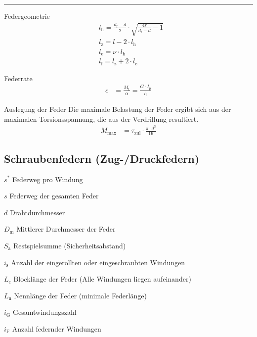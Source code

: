 \hrule
\begin{eeqn}{Federgeometrie}
	\begin{align}
		& l_\text{h} = \frac{d_\text{f}-d}{2}\cdot \sqrt{\frac{4r}{d_\text{f}-d}-1} \\
		& l_\text{z} = l- 2\cdot l_\text{h} \\
		& l_\text{e} = \nu \cdot l_\text{h}\\
		& l_\text{f} = l_\text{z} + 2\cdot l_\text{e}
	\end{align}
\end{eeqn}

\begin{eeqn}{Federrate}
	\begin{align}
		c &= \frac{M_\text{t}}{\alpha} = \frac{G\cdot I_\text{p}}{l_\text{f}}
	\end{align}
\end{eeqn}

\begin{eeqn}{Auslegung der Feder}
	Die maximale Belastung der Feder ergibt sich aus der maximalen Torsionsspannung, die aus der Verdrillung resultiert.
	\begin{align}
		M_\text{max} &= \tau_\text{zul} \cdot \frac{\pi \cdot d^3}{16}
	\end{align}
\end{eeqn}

\subsection{Schraubenfedern (Zug-/Druckfedern)}
\begin{vardef}
	\item[$s^*$] Federweg pro Windung
	\item[$s$] Federweg der gesamten Feder 
	\item[$d$] Drahtdurchmesser
	\item[$D_\text{m}$] Mittlerer Durchmesser der Feder
	\item[$S_\text{a}$] Restspielsumme (Sicherheitsabstand)
	\item[$i_\text{s}$] Anzahl der eingerollten oder eingeschraubten Windungen
	\item[$L_\text{c}$] Blocklänge der Feder (Alle Windungen liegen aufeinander)
	\item[$L_\text{n}$] Nennlänge der Feder (minimale Federlänge)
	\item[$i_\text{G}$] Gesamtwindungszahl
	\item[$i_\text{F}$] Anzahl federnder Windungen
\end{vardef}

